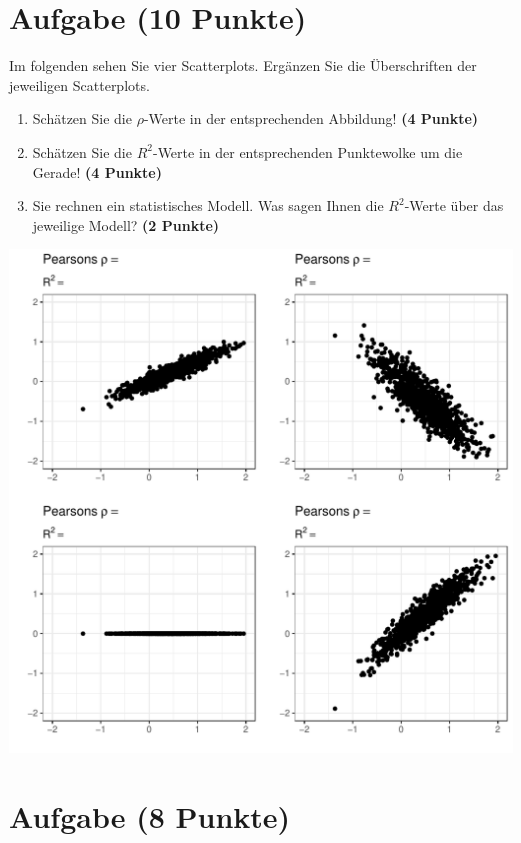 \documentclass[a4paper, 10pt]{scrartcl}\usepackage[]{graphicx}\usepackage[]{xcolor}
\makeatletter
\def\maxwidth{ %
  \ifdim\Gin@nat@width>\linewidth
    \linewidth
  \else
    \Gin@nat@width
  \fi
}
\makeatother
\begin{document}
\section{Aufgabe \hfill (10 Punkte)}

Im folgenden sehen Sie vier Scatterplots. Erg{\"a}nzen Sie die {\"U}berschriften
der jeweiligen Scatterplots.


\begin{enumerate}
\item Sch{\"a}tzen Sie die $\rho$-Werte in der entsprechenden
  Abbildung! \textbf{(4 Punkte)}
\item Sch{\"a}tzen Sie die $R^2$-Werte in der entsprechenden
  Punktewolke um die Gerade! \textbf{(4 Punkte)}
\item Sie rechnen ein statistisches Modell. Was sagen Ihnen die $R^2$-Werte
  {\"u}ber das jeweilige Modell? \textbf{(2 Punkte)}
\end{enumerate}




{\centering \includegraphics[width=\maxwidth]{img/correlation-02-1} 

}



 
\clearpage

\section{Aufgabe \hfill (8 Punkte)}
\end{document}
